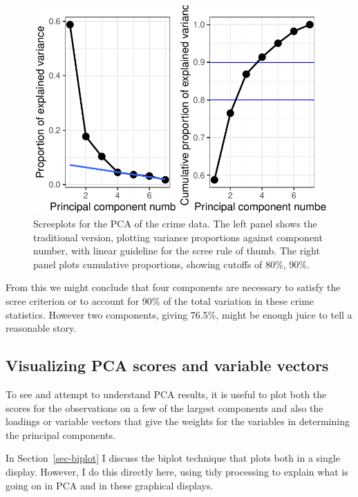 \documentclass[
  letterpaper,
  10pt,
  krantz2]{krantz}
\begin{document}
\begin{figure}[H]

{\centering \includegraphics[width=1\textwidth,height=\textheight]{figs/ch04/fig-crime-ggscreeplot-1.pdf}

}

\caption{\label{fig-crime-ggscreeplot}Screeplots for the PCA of the
crime data. The left panel shows the traditional version, plotting
variance proportions against component number, with linear guideline for
the scree rule of thumb. The right panel plots cumulative proportions,
showing cutoffs of 80\%, 90\%.}

\end{figure}

From this we might conclude that four components are necessary to
satisfy the scree criterion or to account for 90\% of the total
variation in these crime statistics. However two components, giving
76.5\%, might be enough juice to tell a reasonable story.

\hypertarget{visualizing-pca-scores-and-variable-vectors}{%
\subsection{Visualizing PCA scores and variable
vectors}\label{visualizing-pca-scores-and-variable-vectors}}

To see and attempt to understand PCA results, it is useful to plot both
the scores for the observations on a few of the largest components and
also the loadings or variable vectors that give the weights for the
variables in determining the principal components.

In Section~\ref{sec-biplot} I discuss the biplot technique that plots
both in a single display. However, I do this directly here, using tidy
processing to explain what is going on in PCA and in these graphical
displays.
\end{document}
